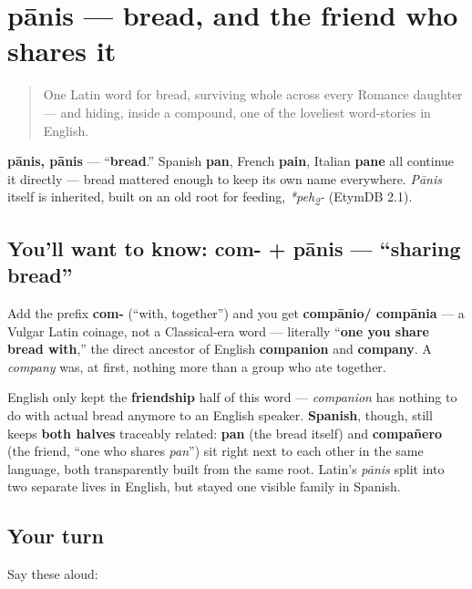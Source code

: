 \section[pānis]{pānis — bread, and the friend who shares it}

\label{lesson:LA-C10-panis}



\begin{quote}
One Latin word for bread, surviving whole across every Romance daughter — and hiding, inside a compound, one of the loveliest word-stories in English.
\end{quote}

\begin{cousinweb}
\textbf{pānis, pānis} — \textquotedblleft{}\textbf{bread}.\textquotedblright{} Spanish \textbf{pan}, French \textbf{pain}, Italian \textbf{pane} all continue it directly — bread mattered enough to keep its own name everywhere. \emph{Pānis} itself is inherited, built on an old root for feeding, \emph{*peh\textsubscript{2}-} (EtymDB 2.1).
\end{cousinweb}

\subsection*{You'll want to know: com- + pānis — \textquotedblleft{}sharing bread\textquotedblright{}}
Add the prefix \textbf{com-} (\textquotedblleft{}with, together\textquotedblright{}) and you get \textbf{compānio/ compānia} — a Vulgar Latin coinage, not a Classical-era word — literally \textquotedblleft{}\textbf{one you share bread with},\textquotedblright{} the direct ancestor of English \textbf{companion} and \textbf{company}. A \emph{company} was, at first, nothing more than a group who ate together.

\begin{culture}
English only kept the \textbf{friendship} half of this word — \emph{companion} has nothing to do with actual bread anymore to an English speaker. \textbf{Spanish}, though, still keeps \textbf{both halves} traceably related: \textbf{pan} (the bread itself) and \textbf{compañero} (the friend, \textquotedblleft{}one who shares \emph{pan}\textquotedblright{}) sit right next to each other in the same language, both transparently built from the same root. Latin's \emph{pānis} split into two separate lives in English, but stayed one visible family in Spanish.
\end{culture}

\subsection*{Your turn}
Say these aloud:

